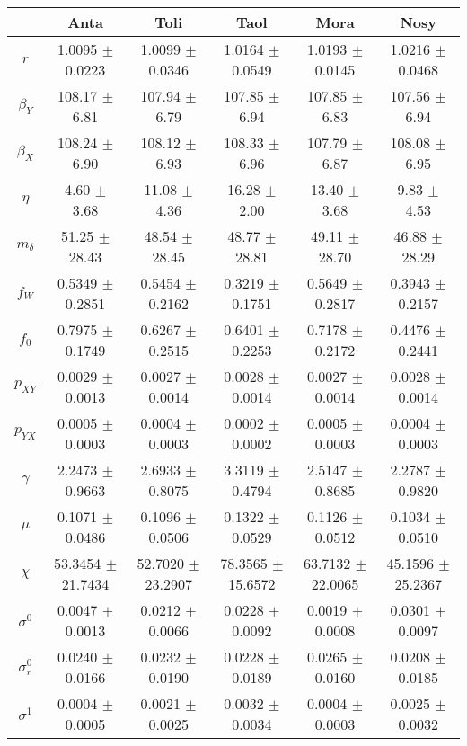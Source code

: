 \begin{sidewaystable}
\centering
\begin{tabular}{cccccc}
 & {\bf Anta} & {\bf Toli} & {\bf Taol} & {\bf Mora} & {\bf Nosy} \\
\hline\hline
{\bf $r$} & 1.0095 $\pm$ 0.0223 & 1.0099 $\pm$ 0.0346 & 1.0164 $\pm$ 0.0549 & 1.0193 $\pm$ 0.0145 & 1.0216 $\pm$ 0.0468 \\
{\bf $\beta_Y$} & 108.17 $\pm$ 6.81 & 107.94 $\pm$ 6.79 & 107.85 $\pm$ 6.94 & 107.85 $\pm$ 6.83 & 107.56 $\pm$ 6.94 \\
{\bf $\beta_X$} & 108.24 $\pm$ 6.90 & 108.12 $\pm$ 6.93 & 108.33 $\pm$ 6.96 & 107.79 $\pm$ 6.87 & 108.08 $\pm$ 6.95 \\
{\bf $\eta$} & 4.60  $\pm$ 3.68 & 11.08 $\pm$ 4.36 & 16.28 $\pm$ 2.00 & 13.40 $\pm$ 3.68 & 9.83 $\pm$ 4.53 \\
{\bf $m_{\delta}$} & 51.25 $\pm$ 28.43 & 48.54 $\pm$ 28.45 & 48.77 $\pm$ 28.81 & 49.11 $\pm$ 28.70 & 46.88 $\pm$ 28.29 \\
{\bf $f_W$} & 0.5349 $\pm$ 0.2851 & 0.5454 $\pm$ 0.2162 & 0.3219 $\pm$ 0.1751 & 0.5649 $\pm$ 0.2817 & 0.3943 $\pm$ 0.2157 \\
{\bf $f_0$} & 0.7975 $\pm$ 0.1749 & 0.6267 $\pm$ 0.2515 & 0.6401 $\pm$ 0.2253 & 0.7178 $\pm$ 0.2172 & 0.4476 $\pm$ 0.2441 \\
{\bf $p_{XY}$} & 0.0029 $\pm$ 0.0013 & 0.0027 $\pm$ 0.0014 & 0.0028 $\pm$ 0.0014 & 0.0027 $\pm$ 0.0014 & 0.0028 $\pm$ 0.0014 \\
{\bf $p_{YX}$} & 0.0005 $\pm$ 0.0003 & 0.0004 $\pm$ 0.0003 & 0.0002 $\pm$ 0.0002 & 0.0005 $\pm$ 0.0003 & 0.0004 $\pm$ 0.0003 \\
{\bf $\gamma$} & 2.2473 $\pm$ 0.9663 & 2.6933 $\pm$ 0.8075 & 3.3119 $\pm$ 0.4794 & 2.5147 $\pm$ 0.8685 & 2.2787 $\pm$ 0.9820 \\
{\bf $\mu$} & 0.1071 $\pm$ 0.0486 & 0.1096 $\pm$ 0.0506 & 0.1322 $\pm$ 0.0529 & 0.1126 $\pm$ 0.0512 & 0.1034 $\pm$ 0.0510 \\
{\bf $\chi$} & 53.3454 $\pm$ 21.7434 & 52.7020 $\pm$ 23.2907 & 78.3565 $\pm$ 15.6572 & 63.7132 $\pm$ 22.0065 & 45.1596 $\pm$ 25.2367 \\
{\bf $\sigma^0$} & 0.0047 $\pm$ 0.0013 & 0.0212 $\pm$ 0.0066 & 0.0228 $\pm$ 0.0092 & 0.0019 $\pm$ 0.0008 & 0.0301 $\pm$ 0.0097 \\
{\bf $\sigma^0_r$} & 0.0240 $\pm$ 0.0166 & 0.0232 $\pm$ 0.0190 & 0.0228 $\pm$ 0.0189 & 0.0265 $\pm$ 0.0160 & 0.0208 $\pm$ 0.0185 \\
{\bf $\sigma^1$} & 0.0004 $\pm$ 0.0005 & 0.0021 $\pm$ 0.0025 & 0.0032 $\pm$ 0.0034 & 0.0004 $\pm$ 0.0003 & 0.0025 $\pm$ 0.0032 \\

\end{tabular}
\end{sidewaystable}
